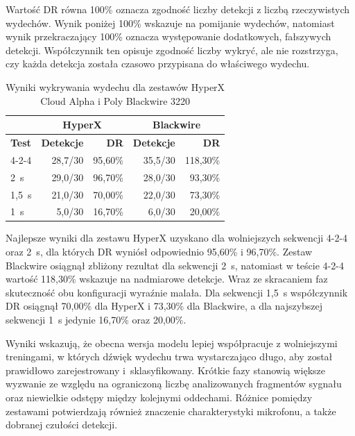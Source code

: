 Wartość DR równa 100\% oznacza zgodność liczby detekcji z liczbą rzeczywistych wydechów. Wynik poniżej 100\% wskazuje na pomijanie wydechów, natomiast wynik przekraczający 100\% oznacza występowanie dodatkowych, fałszywych detekcji. Współczynnik ten opisuje zgodność liczby wykryć, ale nie rozstrzyga, czy każda detekcja została czasowo przypisana do właściwego wydechu.

\begin{table}[H]
    \centering
    \caption{Wyniki wykrywania wydechu dla zestawów HyperX Cloud Alpha i Poly Blackwire 3220}
    \label{tab:headset_detection_ratio}
    \small
    \setlength{\tabcolsep}{5pt}
    \renewcommand{\arraystretch}{1.2}
    \begin{tabular}{@{}lrrrr@{}}
        \toprule
        & \multicolumn{2}{c}{\textbf{HyperX}} & \multicolumn{2}{c}{\textbf{Blackwire}} \\
        \midrule
        \textbf{Test} & \textbf{Detekcje} & \textbf{DR} & \textbf{Detekcje} & \textbf{DR} \\
        \midrule
        4-2-4       & 28,7/30 & 95,60\% & 35,5/30 & 118,30\% \\
        2~s           & 29,0/30 & 96,70\% & 28,0/30 & 93,30\% \\
        1,5~s         & 21,0/30 & 70,00\% & 22,0/30 & 73,30\% \\
        1~s           & 5,0/30  & 16,70\% & 6,0/30  & 20,00\% \\
        \bottomrule
    \end{tabular}
\end{table}

Najlepsze wyniki dla zestawu HyperX uzyskano dla wolniejszych sekwencji 4-2-4 oraz 2~s, dla których DR wyniósł odpowiednio 95,60\% i 96,70\%. Zestaw Blackwire osiągnął zbliżony rezultat dla sekwencji 2~s, natomiast w teście 4-2-4 wartość 118,30\% wskazuje na nadmiarowe detekcje. Wraz ze skracaniem faz skuteczność obu konfiguracji wyraźnie malała. Dla sekwencji 1,5~s współczynnik DR osiągnął 70,00\% dla HyperX i 73,30\% dla Blackwire, a dla najszybszej sekwencji 1~s jedynie 16,70\% oraz 20,00\%.

Wyniki wskazują, że obecna wersja modelu lepiej współpracuje z wolniejszymi treningami, w których dźwięk wydechu trwa wystarczająco długo, aby został prawidłowo zarejestrowany i~sklasyfikowany. Krótkie fazy stanowią większe wyzwanie ze względu na ograniczoną liczbę analizowanych fragmentów sygnału oraz niewielkie odstępy między kolejnymi oddechami. Różnice pomiędzy zestawami potwierdzają również znaczenie charakterystyki mikrofonu, a także dobranej czułości detekcji.

